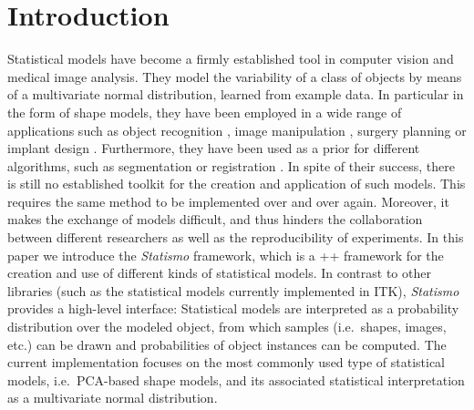 \documentclass{InsightArticle}
\newcommand{\IJhandlerIDnumber}{1338}
\newcommand{\Statismo}{\emph{Statismo}\xspace}
\begin{document}
\IJhandlenote{\IJhandlerIDnumber}

\tableofcontents

\section{Introduction}

Statistical models have become a firmly established tool in computer
vision and medical image analysis.  They model the variability of a
class of objects by means of a multivariate normal distribution,
learned from example data.  In particular in the form of shape models,
they have been employed in a wide range of applications such as object
recognition \cite{cootes_use_1994, paysan_3d_2009}, image manipulation
\cite{blanz_morphable_1999}, surgery planning
\cite{zheng_statistical_2011,hawkes_tissue_2005} or implant design
\cite{bou-sleiman_minimization_2011,kozic_statistical_2009}.
Furthermore, they have been used as a prior for different algorithms,
such as segmentation \cite{heimann_statistical_2009} or registration
\cite{albrecht_statistical_2008}.  In spite of their success, there is
still no established toolkit for the creation and application of such
models. This requires the same method to be implemented over and over
again. Moreover, it makes the exchange of models difficult, and thus
hinders the collaboration between different researchers as well as the
reproducibility of experiments.  In this paper we introduce the
\Statismo framework, which is a \C++ framework for the creation and
use of different kinds of statistical models.  In contrast to other
libraries (such as the statistical models currently implemented in
ITK), \Statismo provides a high-level interface: Statistical models
are interpreted as a probability distribution over the modeled object,
from which samples (i.e.\ shapes, images, etc.)  can be drawn and
probabilities of object instances can be computed.  The current
implementation focuses on the most commonly used type of statistical
models, i.e.\ PCA-based shape models, and its associated statistical
interpretation as a multivariate normal distribution.
\end{document}
